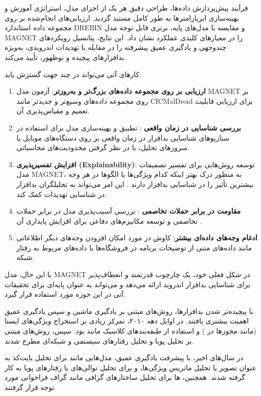 فرآیند پیش‌پردازش داده‌ها، طراحی دقیق هر یک از اجزای مدل، استراتژی آموزش و بهینه‌سازی ابرپارامترها به طور کامل مستند گردید. ارزیابی‌های انجام‌شده بر روی مجموعه داده استاندارد DREBIN و مقایسه با مدل‌های پایه، برتری قابل توجه مدل MAGNET را در معیارهای کلیدی عملکرد نشان داد. این نتایج، پتانسیل رویکردهای چندوجهی و یادگیری عمیق پیشرفته را در مقابله با تهدیدات اندرویدی، به‌ویژه بدافزارهای پیچیده و نوظهور، تأیید می‌کند.

کارهای آتی می‌تواند در چند جهت گسترش یابد:
\begin{enumerate}
    \item \textbf{ارزیابی بر روی مجموعه داده‌های بزرگ‌تر و به‌روزتر}: آزمون مدل MAGNET بر روی مجموعه داده‌های وسیع‌تر و جدیدتر مانند CICMalDroid \cite{CICMalDroid} برای ارزیابی قابلیت تعمیم و مقیاس‌پذیری آن.
    \item \textbf{بررسی شناسایی در زمان واقعی }: تطبیق و بهینه‌سازی مدل برای استفاده در سناریوهای شناسایی بدافزار در زمان واقعی بر روی دستگاه‌های موبایل یا سرورهای تحلیل، با در نظر گرفتن محدودیت‌های محاسباتی.
    \item \textbf{افزایش تفسیرپذیری (Explainability)}: توسعه روش‌هایی برای تفسیر تصمیمات مدل MAGNET، به منظور درک بهتر اینکه کدام ویژگی‌ها یا الگوها در هر وجه بیشترین تأثیر را در شناسایی بدافزار دارند \cite{Marastoni2022}. این امر می‌تواند به تحلیلگران بدافزار در شناسایی تهدیدات کمک کند.
    \item \textbf{مقاومت در برابر حملات تخاصمی }: بررسی آسیب‌پذیری مدل در برابر حملات تخاصمی و توسعه مکانیزم‌های دفاعی برای افزایش پایداری آن \cite{Demontis2017}.
    \item \textbf{ادغام وجه‌های داده‌ای بیشتر}: کاوش در مورد امکان افزودن وجه‌های دیگر اطلاعاتی مانند داده‌های متنی از توضیحات برنامه در فروشگاه‌ها یا داده‌های مربوط به رفتار شبکه.
\end{enumerate}

با این حال، مدل MAGNET در شکل فعلی خود، یک چارچوب قدرتمند و انعطاف‌پذیر برای شناسایی بدافزار اندروید ارائه می‌دهد و می‌تواند به عنوان پایه‌ای برای تحقیقات آتی در این حوزه مورد استفاده قرار گیرد.

با پیچیده‌تر شدن بدافزارها، روش‌های مبتنی بر یادگیری ماشین و سپس یادگیری عمیق اهمیت بیشتری یافتند. در اوایل دهه ۲۰۱۰، تمرکز زیادی بر استخراج ویژگی‌های ایستا (مانند مجوزها در  \cite{Drebin}) و استفاده از طبقه‌بندهای کلاسیک مانند  بود. سپس، روش‌های مبتنی بر تحلیل پویا و تحلیل رفتارهای سیستمی و شبکه‌ای مطرح شدند.

در سال‌های اخیر، با پیشرفت یادگیری عمیق، مدل‌هایی مانند  برای تحلیل بایت‌کد به عنوان تصویر یا تحلیل ماتریس ویژگی‌ها، و  برای تحلیل توالی‌های  یا رفتارهای پویا به کار گرفته شدند. همچنین، ها برای تحلیل ساختارهای گرافی مانند گراف فراخوانی مورد توجه قرار گرفتند.

